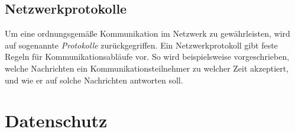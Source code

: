 \documentclass{article}
\begin{document}
	\subsection{Netzwerkprotokolle}
	Um eine ordnungsgemäße Kommunikation im Netzwerk zu gewährleisten, wird auf sogenannte \textit{Protokolle} zurückgegriffen. Ein Netzwerkprotokoll gibt feste Regeln für Kommunikationsabläufe vor. So wird beispielsweise vorgeschrieben, welche Nachrichten ein Kommunikationsteilnehmer zu welcher Zeit akzeptiert, und wie er auf solche Nachrichten antworten soll.


	\section{Datenschutz}
\end{document}
